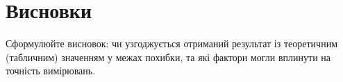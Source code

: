 \documentclass[ukrainian]{ucaphyslab}
\begin{document}

\section{Висновки}
Сформулюйте висновок: чи узгоджується отриманий результат із теоретичним
(табличним) значенням у межах похибки, та які фактори могли вплинути на
точність вимірювань.

\end{document}
